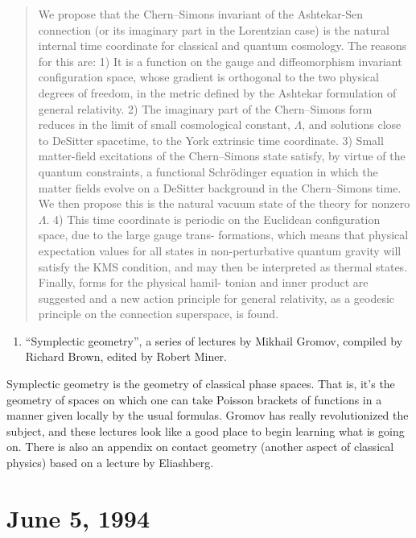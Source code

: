 \documentclass{article}
\def\tightlist{}
\begin{document}
\begin{quote}
We propose that the Chern--Simons invariant of the Ashtekar-Sen
connection (or its imaginary part in the Lorentzian case) is the natural
internal time coordinate for classical and quantum cosmology. The
reasons for this are: 1) It is a function on the gauge and
diffeomorphism invariant configuration space, whose gradient is
orthogonal to the two physical degrees of freedom, in the metric defined
by the Ashtekar formulation of general relativity. 2) The imaginary part
of the Chern--Simons form reduces in the limit of small cosmological
constant, \(\Lambda\), and solutions close to DeSitter spacetime, to the
York extrinsic time coordinate. 3) Small matter-field excitations of the
Chern--Simons state satisfy, by virtue of the quantum constraints, a
functional Schr\"odinger equation in which the matter fields evolve on a
DeSitter background in the Chern--Simons time. We then propose this is
the natural vacuum state of the theory for nonzero \(\Lambda\). 4) This
time coordinate is periodic on the Euclidean configuration space, due to
the large gauge trans- formations, which means that physical expectation
values for all states in non-perturbative quantum gravity will satisfy
the KMS condition, and may then be interpreted as thermal states.
Finally, forms for the physical hamil- tonian and inner product are
suggested and a new action principle for general relativity, as a
geodesic principle on the connection superspace, is found.
\end{quote}

\begin{enumerate}
\def\labelenumi{\arabic{enumi})}
\setcounter{enumi}{4}
\tightlist
\item
  ``Symplectic geometry'', a series of lectures by Mikhail Gromov,
  compiled by Richard Brown, edited by Robert Miner.
 
\end{enumerate}
\noindent
Symplectic geometry is the geometry of classical phase spaces. That is,
it's the geometry of spaces on which one can take Poisson brackets of
functions in a manner given locally by the usual formulas. Gromov has
really revolutionized the subject, and these lectures look like a good
place to begin learning what is going on. There is also an appendix on
contact geometry (another aspect of classical physics) based on a
lecture by Eliashberg.



\hypertarget{week35}{%
\section{June 5, 1994}\label{week35}}
\end{document}
